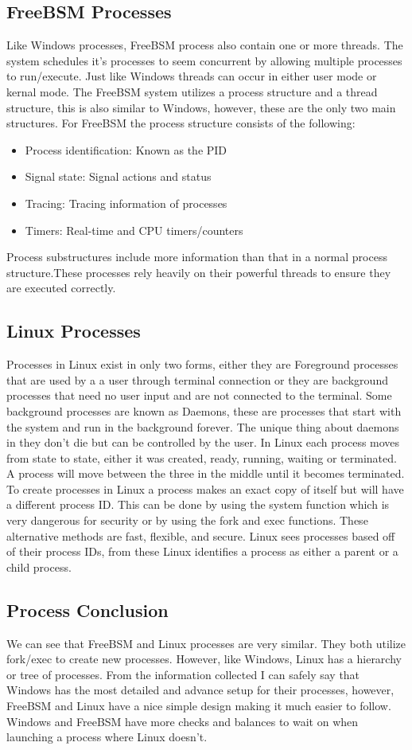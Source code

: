 \documentclass[onecolumn, draftclsnofoot,10pt, compsoc]{IEEEtran}
\begin{document}
\subsection{FreeBSM Processes}
Like Windows processes, FreeBSM process also contain one or more threads. The system schedules it's processes to seem concurrent by allowing multiple processes to run/execute. Just like Windows threads can occur in either user mode or kernal mode. The FreeBSM system utilizes a process structure and a thread structure, this is also similar to Windows, however, these are the only two main structures. For FreeBSM the process structure consists of the following\cite{1}:
\begin{itemize}
	\item Process identification: Known as the PID
	\item Signal state: Signal actions and status 
	\item Tracing: Tracing information of processes  
	\item Timers: Real-time and CPU timers/counters
\end{itemize}
Process substructures include more information than that in a normal process structure.These processes rely heavily on their powerful threads to ensure they are executed correctly.
\subsection{Linux Processes}
Processes in Linux exist in only two forms, either they are Foreground processes that are used by a a user through terminal connection or they are background processes that need no user input and are not connected to the terminal. Some background processes are known as Daemons, these are processes that start with the system and run in the background forever. The unique thing about daemons in they don't die but can be controlled by the user. In Linux each process moves from state to state, either it was created, ready, running, waiting or terminated. A process will move between the three in the middle until it becomes terminated. To create processes in Linux a process makes an exact copy of itself but will have a different process ID. This can be done by using the system function which is very dangerous for security or by using the fork and exec functions. These alternative methods are fast, flexible, and secure. Linux sees processes based off of their process IDs, from these Linux identifies a process as either a parent or a child process\cite{5}.
\subsection{Process Conclusion}
We can see that FreeBSM and Linux processes are very similar. They both utilize fork/exec to create new processes. However, like Windows, Linux has a hierarchy or tree of processes. From the information collected I can safely say that Windows has the most detailed and advance setup for their processes, however, FreeBSM and Linux have a nice simple design making it much easier to follow. Windows and FreeBSM have more checks and balances to wait on when launching a process where Linux doesn't.
\end{document}
